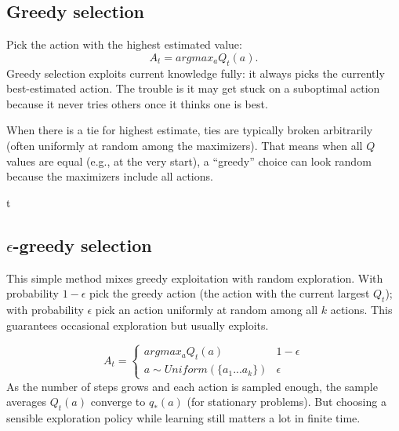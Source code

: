 \subsection{Greedy selection}
Pick the action with the highest estimated value:
\begin{equation*}
    A_t = argmax_a Q_t(a).
\end{equation*}
Greedy selection exploits current knowledge fully: it always picks the currently best-estimated action. The trouble is it may get stuck on a suboptimal action because it never tries others once it thinks one is best.

When there is a tie for highest estimate, ties are typically broken arbitrarily (often uniformly at random among the maximizers). That means when all $Q$ values are equal (e.g., at the very start), a “greedy” choice can look random because the maximizers include all actions.

t\subsection{$\epsilon$-greedy selection}
This simple method mixes greedy exploitation with random exploration. With probability $1-\epsilon$ pick the greedy action (the action with the current largest $Q_t$); with probability $\epsilon$ pick an action uniformly at random among all $k$ actions. This guarantees occasional exploration but usually exploits.

\begin{equation*}
    A_t = \begin{cases}
        argmax_a Q_t(a) & 1 - \epsilon\\
        a \sim Uniform(\{a_1...a_k\}) & \epsilon
    \end{cases}
\end{equation*}
As the number of steps grows and each action is sampled enough, the sample averages $Q_t(a)$ converge to $q_*(a)$ (for stationary problems). But choosing a sensible exploration policy while learning still matters a lot in finite time.


